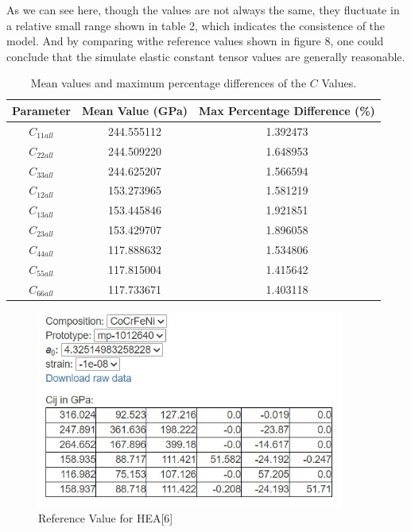 \documentclass[a4paper,11pt]{article} %
\begin{document}
As we can see here, though the values are not always the same, they fluctuate in a relative small range shown in table 2, which indicates the consistence of the model.
And by comparing withe reference values shown in figure 8, one could conclude that the simulate elastic constant tensor values are generally reasonable.
\begin{table}[h!]
    \centering
    \begin{tabular}{|c|c|c|}
    \hline
    Parameter & Mean Value (GPa) & Max Percentage Difference (\%) \\ \hline
    \( C_{11all} \) & 244.555112 & 1.392473 \\ \hline
    \( C_{22all} \) & 244.509220 & 1.648953 \\ \hline
    \( C_{33all} \) & 244.625207 & 1.566594 \\ \hline
    \( C_{12all} \) & 153.273965 & 1.581219 \\ \hline
    \( C_{13all} \) & 153.445846 & 1.921851 \\ \hline
    \( C_{23all} \) & 153.429707 & 1.896058 \\ \hline
    \( C_{44all} \) & 117.888632 & 1.534806 \\ \hline
    \( C_{55all} \) & 117.815004 & 1.415642 \\ \hline
    \( C_{66all} \) & 117.733671 & 1.403118 \\ \hline
    \end{tabular}
    \caption{Mean values and maximum percentage differences of the \( C \) Values.}
    \label{table:c_parameters}
    \end{table}
    \begin{figure}[ht]
        \centering
        \includegraphics[width=0.9\textwidth]{HEA_ref.PNG}
        \caption{Reference Value for HEA[6]}
    \end{figure}
\end{document}
